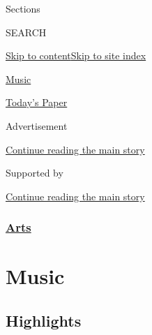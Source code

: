 Sections

SEARCH

\protect\hyperlink{site-content}{Skip to
content}\protect\hyperlink{site-index}{Skip to site index}

\href{https://www.nytimes.com/section/arts/music}{Music}

\href{https://myaccount.nytimes.com/auth/login?response_type=cookie\&client_id=vi}{}

\href{https://www.nytimes.com/section/todayspaper}{Today's Paper}

Advertisement

\protect\hyperlink{after-top}{Continue reading the main story}

Supported by

\protect\hyperlink{after-sponsor}{Continue reading the main story}

\hypertarget{arts}{%
\subsubsection{\texorpdfstring{\href{/section/arts}{Arts}}{Arts}}\label{arts}}

\hypertarget{music}{%
\section{Music}\label{music}}

\hypertarget{highlights}{%
\subsection{Highlights}\label{highlights}}

